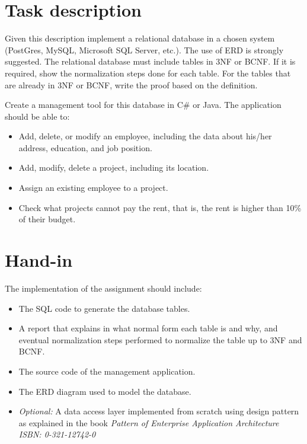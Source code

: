 \documentclass[10pt,a4paper]{article}
\begin{document}
\section*{Task description}
Given this description implement a relational database in a chosen system (PostGres, MySQL, Microsoft SQL Server, etc.). The use of ERD is strongly suggested. The relational database must include tables in 3NF or BCNF. If it is required, show the normalization steps done for each table. For the tables that are already in 3NF or BCNF, write the proof based on the definition.

\noindent
Create a management tool for this database in C\# or Java. The application should be able to:

\begin{itemize}
	\item Add, delete, or modify an employee, including the data about his/her address, education, and job position.
	\item Add, modify, delete a project, including its location.
	\item Assign an existing employee to a project.
	\item Check what projects cannot pay the rent, that is, the rent is higher than 10\% of their budget.
\end{itemize}

\section*{Hand-in}
The implementation of the assignment should include:
\begin{itemize}
	\item The SQL code to generate the database tables.
	\item A report that explains in what normal form each table is and why, and eventual normalization steps performed to normalize the table up to 3NF and BCNF.
	\item The source code of the management application.
	\item The ERD diagram used to model the database.
	\item \textit{Optional:} A data access layer implemented from scratch using design pattern as explained in the book \textit{Pattern of Enterprise Application Architecture ISBN: 0-321-12742-0}
	

\end{itemize}
\end{document}
